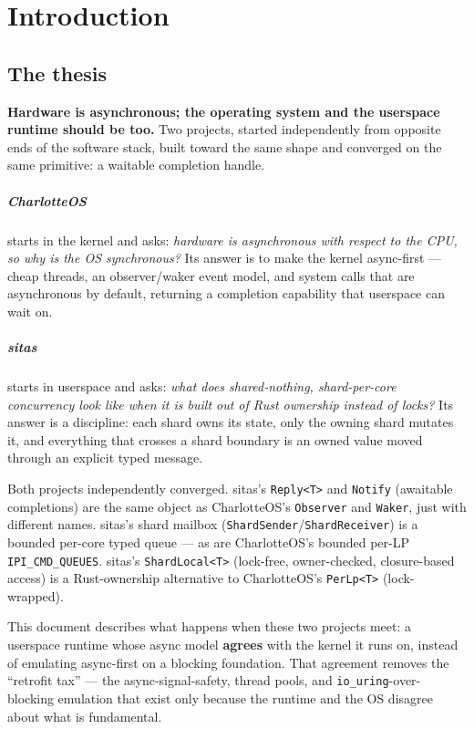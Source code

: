 \chapter{Introduction}

\section{The thesis}

\textbf{Hardware is asynchronous; the operating system and the userspace
runtime should be too.} Two projects, started independently from opposite ends of
the software stack, built toward the same shape and converged on the same
primitive: a waitable completion handle.

\paragraph{CharlotteOS} starts in the kernel and asks: \emph{hardware is
asynchronous with respect to the CPU, so why is the OS synchronous?} Its answer
is to make the kernel async-first --- cheap threads, an observer/waker event
model, and system calls that are asynchronous by default, returning a
completion capability that userspace can wait on.

\paragraph{sitas} starts in userspace and asks: \emph{what does shared-nothing,
shard-per-core concurrency look like when it is built out of Rust ownership
instead of locks?} Its answer is a discipline: each shard owns its state, only
the owning shard mutates it, and everything that crosses a shard boundary is an
owned value moved through an explicit typed message.

Both projects independently converged. sitas's \texttt{Reply<T>} and
\texttt{Notify} (awaitable completions) are the same object as CharlotteOS's
\texttt{Observer} and \texttt{Waker}, just with different names. sitas's shard
mailbox (\texttt{ShardSender}/\texttt{ShardReceiver}) is a bounded per-core
typed queue --- as are CharlotteOS's bounded per-LP \texttt{IPI\_CMD\_QUEUES}.
sitas's \texttt{ShardLocal<T>} (lock-free, owner-checked, closure-based access)
is a Rust-ownership alternative to CharlotteOS's \texttt{PerLp<T>}
(lock-wrapped).

This document describes what happens when these two projects meet: a userspace
runtime whose async model \textbf{agrees} with the kernel it runs on, instead
of emulating async-first on a blocking foundation. That agreement removes the
``retrofit tax'' --- the async-signal-safety, thread pools, and
\texttt{io\_uring}-over-blocking emulation that exist only because the runtime
and the OS disagree about what is fundamental.

